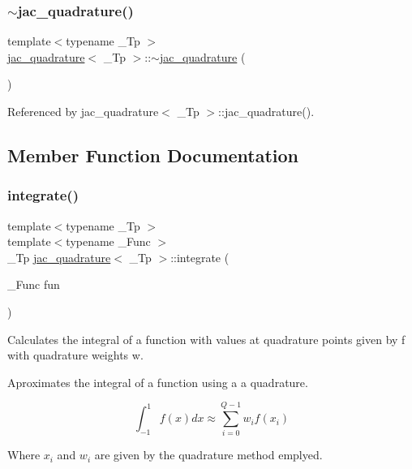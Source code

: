 \subsubsection{\texorpdfstring{$\sim$jac\+\_\+quadrature()}{~jac\_quadrature()}}
{\footnotesize\ttfamily template$<$typename \+\_\+\+Tp $>$ \\
\hyperlink{structjac__quadrature}{jac\+\_\+quadrature}$<$ \+\_\+\+Tp $>$\+::$\sim$\hyperlink{structjac__quadrature}{jac\+\_\+quadrature} (\begin{DoxyParamCaption}{ }\end{DoxyParamCaption})\hspace{0.3cm}{\ttfamily [default]}}



Referenced by jac\+\_\+quadrature$<$ \+\_\+\+Tp $>$\+::jac\+\_\+quadrature().



\subsection{Member Function Documentation}
\mbox{\label{structjac__quadrature_a428a88c5ee5e6b5caae2dd312639297d}} 
\subsubsection{\texorpdfstring{integrate()}{integrate()}}
{\footnotesize\ttfamily template$<$typename \+\_\+\+Tp $>$ \\
template$<$typename \+\_\+\+Func $>$ \\
\+\_\+\+Tp \hyperlink{structjac__quadrature}{jac\+\_\+quadrature}$<$ \+\_\+\+Tp $>$\+::integrate (\begin{DoxyParamCaption}\item[{\+\_\+\+Func}]{fun }\end{DoxyParamCaption})}



Calculates the integral of a function with values at quadrature points given by f with quadrature weights w. 

Aproximates the integral of a function using a a quadrature.

\[ \int_{-1}^1 f(x) dx \approx \sum_{i=0}^{Q-1} w_i f(x_i) \]

Where $x_i$ and $w_i$ are given by the quadrature method emplyed.


